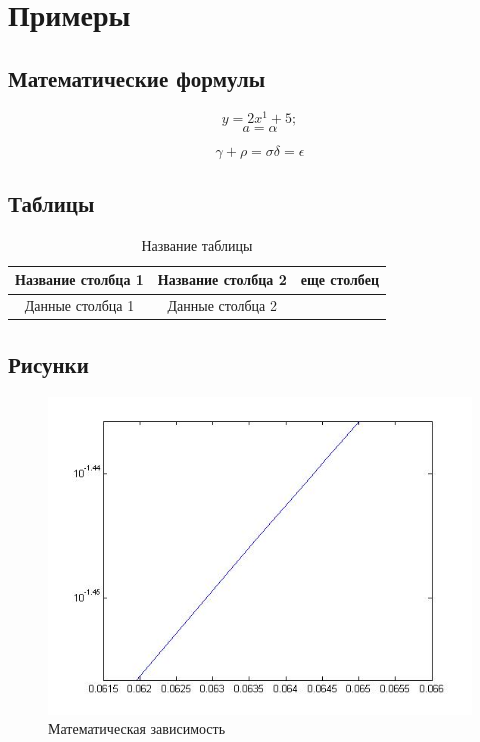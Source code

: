 \section{Примеры}

\begingroup
\subsection{Математические формулы}
\begin{equation}
y = 2x^1+5;
\end{equation}
\begin{equation}
a = \alpha    
\end{equation}

\begin{equation}
    \gamma +\rho = \sigma 
    \delta = \epsilon
\end{equation}
\endgroup

\begingroup
\subsection{Таблицы}
\begin{table}
    \centering
    \begin{tabular}{c|c|c}
        Название столбца 1 & Название столбца 2& еще столбец \\
        \hline
        Данные столбца 1 & Данные столбца 2& 
    \end{tabular}
    \caption{Название таблицы}
    \label{tab:my_label}
\end{table}
\endgroup
\begingroup
\subsection{Рисунки}
\begin{figure}
  \includegraphics[width=\textwidth]{Scheme_example.jpg} %
   \caption{Математическая зависимость}
    \label{fig:my_label}
\end{figure}
\endgroup






